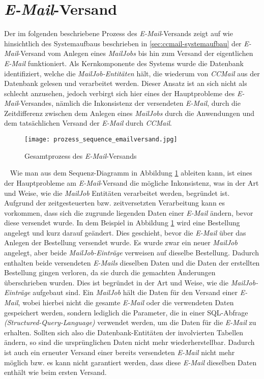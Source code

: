 \section{\emph{E-Mail}-Versand}
\label{sec:ccmail-email-versand}
Der im folgenden beschriebene Prozess des \emph{E-Mail}-Versands zeigt auf wie hinsichtlich des Systemaufbaus beschrieben in \ref{sec:ccmail-systemaufbau} der \emph{E-Mail}-Versand vom Anlegen eines \emph{MailJobs} bis hin zum Versand der eigentlichen \emph{E-Mail} funktioniert. 
\newline
\newline
Als Kernkomponente des Systems wurde die Datenbank identifiziert, welche die \emph{MailJob-Entitäten} hält, die wiederum von \emph{CCMail} aus der Datenbank gelesen und verarbeitet werden. Dieser Ansatz ist an sich nicht als schlecht anzusehen, jedoch verbirgt sich hier eines der Hauptprobleme des \emph{E-Mail}-Versandes, nämlich die Inkonsistenz der versendeten \emph{E-Mail}, durch die Zeitdifferenz zwischen dem Anlegen eines \emph{MailJobs} durch die Anwendungen und dem tatsächlichen Versand der \emph{E-Mail} durch \emph{CCMail}.
\begin{figure}[h]
\centering
\texttt{[image: prozess\_sequence\_emailversand.jpg]}
\caption{Gesamtprozess des \emph{E-Mail}-Versands}
\label{fig:sequence-diagramm-gesamtprozess}
\end{figure}
\ \newline
Wie man aus dem Sequenz-Diagramm in Abbildung \ref{fig:sequence-diagramm-gesamtprozess} ableiten kann, ist eines der Hauptprobleme am \emph{E-Mail}-Versand die mögliche Inkonsistenz, was in der Art und Weise, wie die \emph{MailJob} Entitäten verarbeitet werden, begründet ist. Aufgrund der zeitgesteuerten bzw. zeitversetzten Verarbeitung kann es vorkommen, dass sich die zugrunde liegenden Daten einer \emph{E-Mail} ändern, bevor diese versendet wurde. In dem Beispiel in Abbildung \ref{fig:sequence-diagramm-gesamtprozess} wird eine Bestellung angelegt und kurz darauf geändert. Dies geschieht, bevor die \emph{E-Mail} über das Anlegen der Bestellung versendet wurde. Es wurde zwar ein neuer \emph{MailJob} angelegt, aber beide \emph{MailJob-Einträge} verweisen auf dieselbe Bestellung. Dadurch enthalten beide versendeten \emph{E-Mails} dieselben Daten und die Daten der erstellten Bestellung gingen verloren, da sie durch die gemachten Änderungen überschrieben wurden. 
\newpage
Dies ist begründet in der Art und Weise, wie die \emph{MailJob-Einträge} aufgebaut sind. Ein \emph{MailJob} hält die Daten für den Versand einer \emph{E-Mail}, wobei hierbei nicht die gesamte \emph{E-Mail} oder die verwendeten Daten gespeichert werden, sondern lediglich die Parameter, die in einer SQL-Abfrage \emph{(Structured-Query-Language)} verwendet werden, um die Daten für die \emph{E-Mail} zu erhalten. Sollten sich also die Datenbank-Entitäten der involvierten Tabellen ändern, so sind die ursprünglichen Daten nicht mehr wiederherstellbar. Dadurch ist auch ein erneuter Versand einer bereits versendeten \emph{E-Mail} nicht mehr möglich bzw. es kann nicht garantiert werden, dass diese \emph{E-Mail} dieselben Daten enthält wie beim ersten Versand.
